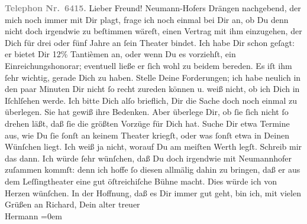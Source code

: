 \begin{ledgroupsized}[t]{13cm}
           \pstart
           \textcolor{gray}{\textbf{Telephon Nr. 6415.}}\pend
           \pstart\center{}Lieber Freund!\pend\pstart
           Neumann-Hofers Drängen nachgebend, der mich
               noch immer mit Dir plagt, frage ich noch einmal bei Dir an, ob Du denn nicht doch
               irgendwie zu beſtimmen wäreſt, einen Vertrag mit ihm einzugehen, der Dich für drei
               oder fünf Jahre an ſein Theater
               bindet. Ich habe Dir schon geſagt: er bietet Dir 12{\%}
               Tantièmen an, oder wenn Du es vorziehſt, ein Einreichungs{\pb}honorar; eventuell ließe er ſich wohl zu beidem
               bereden. Es iſt ihm ſehr wichtig, gerade Dich zu haben. Stelle Deine Forderungen; ich
               habe neulich in den paar Minuten Dir nicht ſo recht zureden können u. weiß nicht, ob
               ich Dich in Iſchlſehen werde. Ich bitte Dich alſo brieflich, Dir die
               Sache doch noch einmal zu überlegen. Sie hat gewiß ihre Bedenken. Aber überlege Dir,
               ob ſie ſich nicht ſo drehen läßt, daß ſie die größten Vorzüge für Dich hat. Suche Dir
               etwa Termine aus, wie Du ſie ſonſt an keinem Theater {\pb}kriegſt, oder was ſonſt etwa in Deinen Wünſchen
               liegt. Ich weiß ja nicht, worauf Du am meiſten Werth legſt. Schreib mir das dann. Ich
               würde ſehr wünſchen, daß Du doch irgendwie mit Neumannhofer zuſammen kommſt: denn ich hoffe ſo diesen allmälig dahin zu
               bringen, daß er aus dem Leſſingtheater eine gut
                  öſtreichiſche Bühne macht. Dies würde ich
               von Herzen wünſchen.\pend
           \pstart
           In der Hoffnung, daß es Dir immer gut geht, bin ich, mit vielen Grüßen {\pb}an Richard,\pend
           \pstart
           Dein alter treuer{\\[\baselineskip]}\spacefill\mbox{Hermann}\pend
           \leftskip=0em{}\pstart
           \textcolor{gray}{\textbf{\label{T_L00695_1v}\label{T_L00695_1h}}}\pend
           
         
         \endnumbering{}\end{ledgroupsized}  \newcommand{\dateiname}{L00695}\newcommand{\titel}{Hermann Bahr an Arthur Schnitzler, 8. 7. 1897}\newcommand{\editorInnen}{ Kurt Ifkovits,  Martin Anton Müller}
      